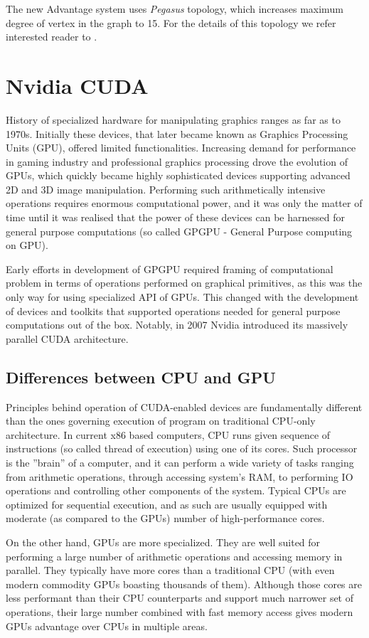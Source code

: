 The new Advantage system uses \emph{Pegasus} topology, which increases maximum degree of vertex in the graph to 15. For the details of this topology we refer interested reader to \cite{boothby}.


\section{Nvidia CUDA}
History of specialized hardware for manipulating graphics ranges as far as to 1970s. Initially these devices, that later became known as Graphics Processing Units (GPU), offered limited functionalities. Increasing demand for performance in gaming industry and professional graphics processing drove the evolution of GPUs, which quickly became highly sophisticated devices supporting advanced 2D and 3D image manipulation. Performing such arithmetically intensive operations requires enormous computational power, and it was only the matter of time until it was realised that the power of these devices can be harnessed for general purpose computations (so called GPGPU - General Purpose computing on GPU). 

Early efforts in development of GPGPU required framing of computational problem in terms of operations performed on graphical primitives, as this was the only way for using specialized API of GPUs. This changed with the development of devices and toolkits that supported operations needed for general purpose computations out of the box. Notably, in 2007 Nvidia introduced its massively parallel CUDA architecture.

\subsection{Differences between CPU and GPU}
Principles behind operation of CUDA-enabled devices are fundamentally different than the ones governing execution of program on traditional CPU-only architecture. In current x86 based computers, CPU runs given sequence of instructions (so called thread of execution) using one of its cores. Such processor is the ''brain'' of a computer, and it can perform a wide variety of tasks ranging from arithmetic operations, through accessing system's RAM, to performing IO operations and controlling other components of the system. Typical CPUs are optimized for sequential execution, and as such are usually equipped with moderate (as compared to the GPUs) number of high-performance cores. 

On the other hand, GPUs are more specialized. They are well suited for performing a large number of arithmetic operations and accessing memory in parallel. They typically have more cores than a traditional CPU (with even modern commodity GPUs boasting thousands of them). Although those cores are less performant than their CPU counterparts and support much narrower set of operations, their large number combined with fast memory access gives modern GPUs advantage over CPUs in multiple areas.


